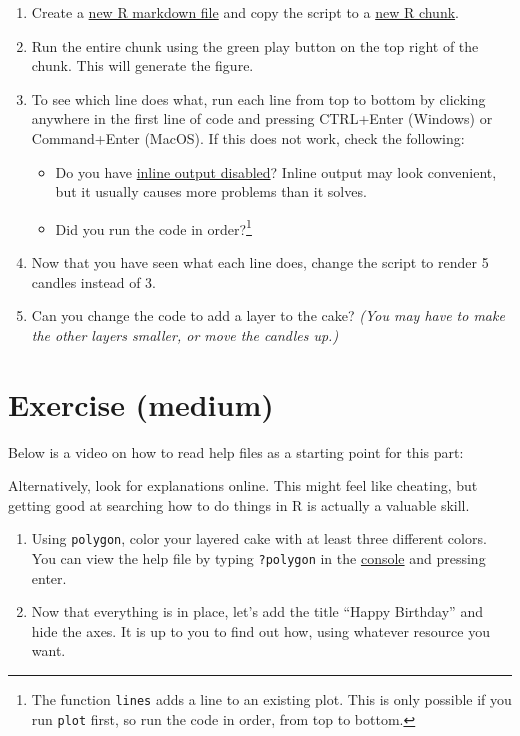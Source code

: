 \documentclass[
]{book}
\providecommand{\tightlist}{%
  \setlength{\itemsep}{0pt}\setlength{\parskip}{0pt}}
\begin{document}
\begin{enumerate}
\def\labelenumi{\arabic{enumi}.}
\tightlist
\item
  Create a \href{https://youtu.be/2Sovzf6lVRo?t=280}{new R markdown file} and copy the script to a \href{https://youtu.be/AHAR7j-IUOw?t=358}{new R chunk}.
\item
  Run the entire chunk using the green play button on the top right of the chunk. This will generate the figure.
\item
  To see which line does what, run each line from top to bottom by clicking anywhere in the first line of code and pressing CTRL+Enter (Windows) or Command+Enter (MacOS). If this does not work, check the following:

  \begin{itemize}
  \tightlist
  \item
    Do you have \href{https://youtu.be/AHAR7j-IUOw?t=110}{inline output disabled}? Inline output may look convenient, but it usually causes more problems than it solves.
  \item
    Did you run the code in order?\footnote{The function \texttt{lines} adds a line to an existing plot. This is only possible if you run \texttt{plot} first, so run the code in order, from top to bottom.}
  \end{itemize}
\item
  Now that you have seen what each line does, change the script to render 5 candles instead of 3.
\item
  Can you change the code to add a layer to the cake? \emph{(You may have to make the other layers smaller, or move the candles up.)}
\end{enumerate}

\hypertarget{exercise-medium}{%
\section{Exercise (medium)}\label{exercise-medium}}

Below is a video on how to read help files as a starting point for this part:

Alternatively, look for explanations online. This might feel like cheating, but getting good at searching how to do things in R is actually a valuable skill.

\begin{enumerate}
\def\labelenumi{\arabic{enumi}.}
\tightlist
\item
  Using \texttt{polygon}, color your layered cake with at least three different colors. You can view the help file by typing \texttt{?polygon} in the \href{https://youtu.be/AHAR7j-IUOw?t=133}{console} and pressing enter.
\item
  Now that everything is in place, let's add the title ``Happy Birthday'' and hide the axes. It is up to you to find out how, using whatever resource you want.
\end{enumerate}
\end{document}
